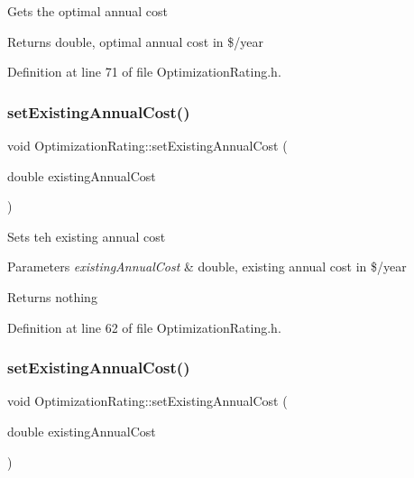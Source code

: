 Gets the optimal annual cost

\begin{DoxyReturn}{Returns}
double, optimal annual cost in \$/year 
\end{DoxyReturn}


Definition at line 71 of file Optimization\+Rating.\+h.

\mbox{\label{class_optimization_rating_a167d4626ab234baf7facce5fe8e4b32d}} 
\subsubsection{\texorpdfstring{set\+Existing\+Annual\+Cost()}{setExistingAnnualCost()}\hspace{0.1cm}{\footnotesize\ttfamily [1/3]}}
{\footnotesize\ttfamily void Optimization\+Rating\+::set\+Existing\+Annual\+Cost (\begin{DoxyParamCaption}\item[{double}]{existing\+Annual\+Cost }\end{DoxyParamCaption})\hspace{0.3cm}{\ttfamily [inline]}}

Sets teh existing annual cost


\begin{DoxyParams}{Parameters}
{\em existing\+Annual\+Cost} & double, existing annual cost in \$/year\\
\hline
\end{DoxyParams}
\begin{DoxyReturn}{Returns}
nothing 
\end{DoxyReturn}


Definition at line 62 of file Optimization\+Rating.\+h.

\mbox{\label{class_optimization_rating_a167d4626ab234baf7facce5fe8e4b32d}} 
\subsubsection{\texorpdfstring{set\+Existing\+Annual\+Cost()}{setExistingAnnualCost()}\hspace{0.1cm}{\footnotesize\ttfamily [2/3]}}
{\footnotesize\ttfamily void Optimization\+Rating\+::set\+Existing\+Annual\+Cost (\begin{DoxyParamCaption}\item[{double}]{existing\+Annual\+Cost }\end{DoxyParamCaption})\hspace{0.3cm}{\ttfamily [inline]}}

